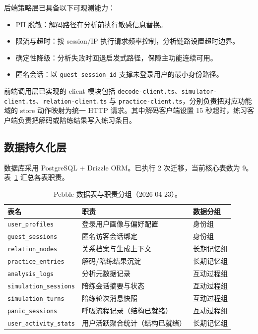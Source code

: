 后端策略层已具备以下可观测能力：

\begin{itemize}
  \item PII 脱敏：解码路径在分析前执行敏感信息替换。
  \item 限流与超时：按 session/IP 执行请求频率控制，分析链路设置超时边界。
  \item 确定性降级：分析失败时回退启发式路径，保障主功能连续可用。
  \item 匿名会话：以 \texttt{guest\_session\_id} 支撑未登录用户的最小身份路径。
\end{itemize}

前端调用层已实现的 client 模块包括 \texttt{decode-client.ts}、\texttt{simulator-client.ts}、\texttt{relation-client.ts} 与 \texttt{practice-client.ts}，分别负责把对应功能域的 store 动作映射为统一 HTTP 请求。其中解码客户端设置 15 秒超时，练习客户端负责把解码或陪练结果写入练习条目。

\subsection{数据持久化层}

数据库采用 PostgreSQL + Drizzle ORM。已执行 2 次迁移，当前核心表数为 9。表~\ref{tab:pebble-db-tables} 汇总各表职责。

\begin{table}[H]
  \centering
  \caption{Pebble 数据表与职责分组（2026-04-23）。}
  \label{tab:pebble-db-tables}
  \begin{tabularx}{\textwidth}{>{\raggedright\arraybackslash}p{3cm} >{\raggedright\arraybackslash}X >{\raggedright\arraybackslash}p{3cm}}
    \toprule
    表名 & 职责 & 数据分组 \\
    \midrule
    \texttt{user\_profiles} & 登录用户画像与偏好配置 & 身份组 \\
    \texttt{guest\_sessions} & 匿名访客会话绑定 & 身份组 \\
    \texttt{relation\_nodes} & 关系档案与生成上下文 & 长期记忆组 \\
    \texttt{practice\_entries} & 解码/陪练结果沉淀 & 长期记忆组 \\
    \texttt{analysis\_logs} & 分析元数据记录 & 互动过程组 \\
    \texttt{simulation\_sessions} & 陪练会话摘要与状态 & 互动过程组 \\
    \texttt{simulation\_turns} & 陪练轮次消息快照 & 互动过程组 \\
    \texttt{panic\_sessions} & 呼吸流程记录（结构已就绪） & 互动过程组 \\
    \texttt{user\_activity\_stats} & 用户活跃聚合统计（结构已就绪） & 长期记忆组 \\
    \bottomrule
  \end{tabularx}
\end{table}

